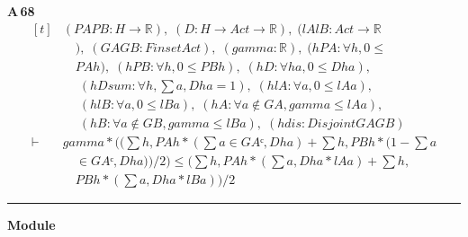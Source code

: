 \noindent\textbf{A\,68}\quad{}
{\footnotesize\[ \begin{aligned}[t]
&(\mathit{PA} \mathit{PB} : \mathit{H} \to \mathbb{R} ),\; (\mathit{D} : \mathit{H} \to \mathit{Act} \to \mathbb{R} ),\; (\mathit{lA} \mathit{lB} : \mathit{Act} \to \mathbb{R}\\
&\quad ),\; (\mathit{GA} \mathit{GB} : \mathit{Finset} \mathit{Act}),\; (\mathit{gamma} : \mathbb{R} ),\; (\mathit{hPA} : \forall \mathit{h}, 0 \leq\\
&\quad \mathit{PA} \mathit{h}),\; (\mathit{hPB} : \forall \mathit{h}, 0 \leq \mathit{PB} \mathit{h}),\; (\mathit{hD} : \forall \mathit{h} \mathit{a}, 0 \leq \mathit{D} \mathit{h} \mathit{a}),\\
&\quad \; (\mathit{hDsum} : \forall \mathit{h}, \textstyle\sum \mathit{a}, \mathit{D} \mathit{h} \mathit{a} = 1),\; (\mathit{hlA} : \forall \mathit{a}, 0 \leq \mathit{lA} \mathit{a}),\\
&\quad \; (\mathit{hlB} : \forall \mathit{a}, 0 \leq \mathit{lB} \mathit{a}),\; (\mathit{hA} : \forall \mathit{a} \notin \mathit{GA}, \mathit{gamma} \leq \mathit{lA} \mathit{a}),\\
&\quad \; (\mathit{hB} : \forall \mathit{a} \notin \mathit{GB}, \mathit{gamma} \leq \mathit{lB} \mathit{a}),\; (\mathit{hdis} : \mathit{Disjoint} \mathit{GA} \mathit{GB})\\
\vdash\;&\mathit{gamma} * ((\textstyle\sum \mathit{h}, \mathit{PA} \mathit{h} * (\textstyle\sum \mathit{a} \in \mathit{GAᶜ}, \mathit{D} \mathit{h} \mathit{a}) + \textstyle\sum \mathit{h}, \mathit{PB} \mathit{h} * (1 - \textstyle\sum \mathit{a}\\
&\quad \in \mathit{GAᶜ}, \mathit{D} \mathit{h} \mathit{a})) / 2) \leq (\textstyle\sum \mathit{h}, \mathit{PA} \mathit{h} * (\textstyle\sum \mathit{a}, \mathit{D} \mathit{h} \mathit{a} * \mathit{lA} \mathit{a}) + \textstyle\sum \mathit{h},\\
&\quad \mathit{PB} \mathit{h} * (\textstyle\sum \mathit{a}, \mathit{D} \mathit{h} \mathit{a} * \mathit{lB} \mathit{a})) / 2
\end{aligned} \]}

\vspace{4pt}\noindent\rule{\columnwidth}{0.4pt}\par\vspace{2pt}
\noindent\textbf{Module }\par\vspace{3pt}

